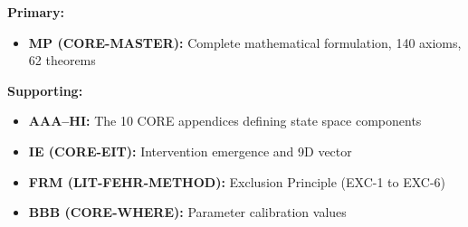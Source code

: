 \begin{tcolorbox}[colback=green!5!white,colframe=green!75!black,
    title=\textbf{Appendix References}]
\small
\textbf{Primary:}
\begin{itemize}[noitemsep]
    \item \textbf{MP (CORE-MASTER):} Complete mathematical formulation, 140 axioms, 62 theorems
\end{itemize}
\textbf{Supporting:}
\begin{itemize}[noitemsep]
    \item \textbf{AAA--HI:} The 10 CORE appendices defining state space components
    \item \textbf{IE (CORE-EIT):} Intervention emergence and 9D vector
    \item \textbf{FRM (LIT-FEHR-METHOD):} Exclusion Principle (EXC-1 to EXC-6)
    \item \textbf{BBB (CORE-WHERE):} Parameter calibration values
\end{itemize}
\end{tcolorbox}

